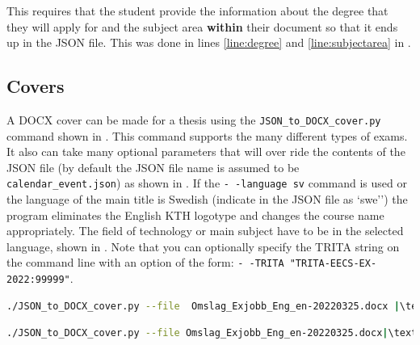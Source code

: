 This requires that the student provide the information about the degree that they will apply for and the subject area \textbf{within} their document so that it ends up in the JSON file. This was done in lines  \ref{line:degree} and \ref{line:subjectarea} in .

\subsection{Covers}
A DOCX cover can be made for a thesis using the \texttt{JSON\_to\_DOCX\_cover.py} command shown in . This command supports the many different types of exams. It also can take many optional parameters that will over ride the contents of the JSON file (by default the JSON file name is assumed to be \texttt{calendar\_event.json}) as shown in . If the \texttt{\hbox{-\,-language sv}} command is used or the language of the main title is Swedish (indicate in the JSON file as `swe'') the program eliminates the English KTH logotype and changes the course name appropriately. The field of technology or main subject have to be in the selected language, shown in . Note that you can optionally specify the TRITA string on the command line with an option of the form:
\texttt{\hbox{-\,-TRITA  "TRITA-EECS-EX-2022:99999"}}.

\begin{lstlisting}[escapechar=|, basicstyle=\footnotesize, language={bash}, caption={Command to make a cover DOCX file with a specified TRITA string}, label=lst:JSONtoDOCXcover]
./JSON_to_DOCX_cover.py --file  Omslag_Exjobb_Eng_en-20220325.docx |\textbackslash \\| --exam kandidatexamen  --trita "TRITA-EECS-EX-2021:219"
\end{lstlisting}

\begin{lstlisting}[escapechar=|, basicstyle=\footnotesize, language={bash}, caption={Command to make a cover DOCX file with the specified values}, label=lst:JSONtoDOCXcover2]
./JSON_to_DOCX_cover.py --file Omslag_Exjobb_Eng_en-20220325.docx|\textbackslash \\| --cycle 2 --credits 30.0 --area "bioteknik" --area2 "kemiteknik"|\textbackslash \\| --exam both --trita "TRITA-CBH-EX-2021:00"|\textbackslash \\| --language sv  --json calendar-sv.json
\end{lstlisting}

